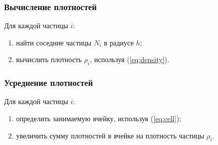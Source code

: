 \subsubsection{Вычисление плотностей}
Для каждой частицы $i$:
\begin{enumerate}
  \item найти соседние частицы $N_i$ в радиусе $h$;
  \item вычислить плотность $\rho_i$, используя (\ref{eq:density}).
\end{enumerate}


\subsubsection{Усреднение плотностей}
Для каждой частицы $i$:
\begin{enumerate}
  \item определить занимаемую ячейку, используя (\ref{eq:cell});
  \item увеличить сумму плотностей в ячейке на плотность частицы $\rho_i$.
\end{enumerate}


